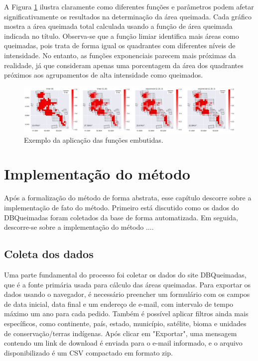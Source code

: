 \documentclass[cic,tc]{iiufrgs}
\begin{document}
A Figura \ref{fig:aplicacao_funcoes_built_in} ilustra claramente como diferentes funções e parâmetros podem afetar significativamente os resultados na determinação da área queimada. Cada gráfico mostra a área queimada total calculada usando a função de área queimada indicada no título. Observa-se que a função limiar identifica mais áreas como queimadas, pois trata de forma igual os quadrantes com diferentes níveis de intensidade. No entanto, as funções exponenciais parecem mais próximas da realidade, já que consideram apenas uma porcentagem da área dos quadrantes próximos aos agrupamentos de alta intensidade como queimados. \par

\begin{figure}[H]
    \caption{Exemplo da aplicação das funções embutidas.}
    \begin{center}
        \includegraphics[width=35em]{aplicacao_funcoes_built_in}
    \end{center}
    \label{fig:aplicacao_funcoes_built_in}
\end{figure}

\chapter{Implementação do método}

Após a formalização do método de forma abstrata, esse capítulo descorre sobre a implementação de fato do método. Primeiro está discutido como os dados do DBQueimadas foram coletados da base de forma automatizada. Em seguida, descorre-se sobre a implementação do método ....

\section{Coleta dos dados}

Uma parte fundamental do processo foi coletar os dados do site DBQueimadas, que é a fonte primária usada para cálculo das áreas queimadas. Para exportar os dados usando o navegador, é necessário preencher um formulário com os campos de data inicial, data final e um endereço de e-mail, com intervalo de tempo máximo um ano para cada pedido. Também é possível aplicar filtros ainda mais específicos, como continente, país, estado, município, satélite, bioma e unidades de conservação/terras indígenas. Após clicar em "Exportar", uma mensagem contendo um link de download é enviada para o e-mail informado, e o arquivo disponibilizado é um CSV compactado em formato zip.
\end{document}
